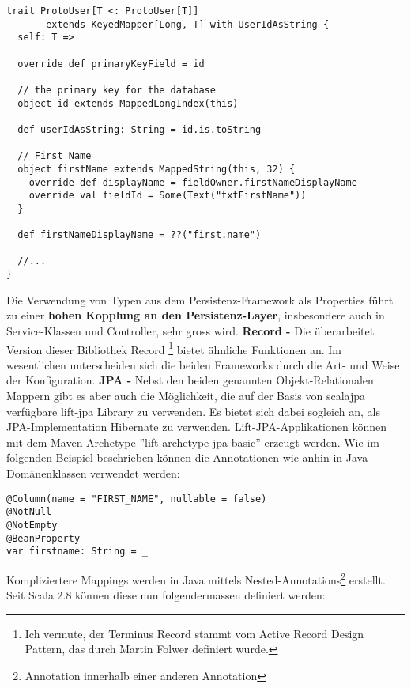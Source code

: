 \begin{lstlisting}[caption=Beispiel Mapping User Klasse mit Mapper]
trait ProtoUser[T <: ProtoUser[T]] 
       extends KeyedMapper[Long, T] with UserIdAsString {
  self: T =>

  override def primaryKeyField = id

  // the primary key for the database
  object id extends MappedLongIndex(this)

  def userIdAsString: String = id.is.toString

  // First Name
  object firstName extends MappedString(this, 32) {
    override def displayName = fieldOwner.firstNameDisplayName
    override val fieldId = Some(Text("txtFirstName"))
  }

  def firstNameDisplayName = ??("first.name")

  //...
} 
\end{lstlisting}
Die Verwendung von Typen aus dem Persistenz-Framework als Properties f\"uhrt zu einer \textbf{hohen Kopplung an den Persistenz-Layer}\label{persistenz:kopplung}, insbesondere auch in Service-Klassen und Controller, sehr gross wird.\newline\newline
\textbf{Record - }Die \"uberarbeitet Version dieser Bibliothek Record \footnote{Ich vermute, der Terminus Record stammt vom Active Record Design Pattern, das durch Martin Folwer definiert wurde.} bietet \"ahnliche Funktionen an. 
Im wesentlichen unterscheiden sich die beiden Frameworks durch die Art- und Weise der Konfiguration. \newline\newline
\textbf{JPA - }Nebst den beiden genannten Objekt-Relationalen Mappern gibt es aber auch die M\"oglichkeit, die auf der Basis von scalajpa verf\"ugbare lift-jpa Library zu verwenden. Es bietet sich dabei sogleich an, als JPA-Implementation Hibernate zu verwenden. Lift-JPA-Applikationen k\"onnen mit dem Maven Archetype ''lift-archetype-jpa-basic'' erzeugt werden. Wie im folgenden Beispiel beschrieben k\"onnen die Annotationen wie anhin in Java Dom\"anenklassen verwendet werden:
\begin{lstlisting}[caption=Property Mapping mit JPA]
@Column(name = "FIRST_NAME", nullable = false)
@NotNull
@NotEmpty
@BeanProperty
var firstname: String = _
\end{lstlisting}

Kompliziertere Mappings werden in Java mittels Nested-Annotations\footnote{Annotation innerhalb einer anderen Annotation} erstellt. Seit Scala 2.8 k\"onnen diese nun folgendermassen definiert werden:

